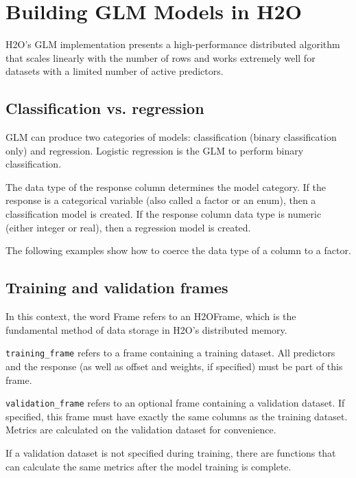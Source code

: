 \section{Building GLM Models in H2O}

H2O's GLM implementation presents a high-performance distributed algorithm that scales linearly with the number
of rows and works extremely well for datasets with a limited number of active predictors.

\subsection{Classification vs. regression}

GLM can produce two categories of models: classification (binary classification only) and regression. Logistic regression is the GLM to perform binary classification.

The data type of the response column determines the model category.  If the response is a categorical variable
(also called a factor or an enum), then a classification model is created.  If the response column data type is
numeric (either integer or real), then a regression model is created.

The following examples show how to coerce the data type of a column to a factor.

\bigskip
\waterExampleInR


\waterExampleInPython


\subsection{Training and validation frames}

In this context, the word Frame refers to an H2OFrame, which is the fundamental method of data storage in H2O's distributed memory.

\texttt{training\_frame} refers to a frame containing a training dataset.  All predictors and the response (as
well as offset and weights, if specified) must be part of this frame.

\texttt{validation\_frame} refers to an optional frame containing a validation dataset.  If specified, this 
frame must have exactly the same columns as the training dataset.  Metrics are calculated on the validation dataset
for convenience.

If a validation dataset is not specified during training, there are functions that can calculate the same metrics after the model training is complete. %

